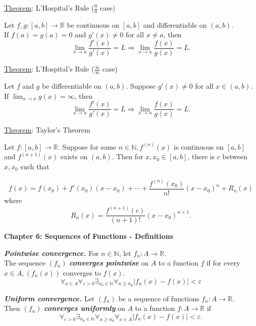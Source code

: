 \documentclass[12pt]{article}
\newcommand{\RR}{\mathbb{R}} %
\newcommand{\NN}{\mathbb{N}}
\newcommand\abs[1]{\left| #1 \right|} %
\newcommand{\eps}{\varepsilon}
\newcommand\defword[1]{\textit{\textbf{#1}}}
\begin{document}
\hrulefill

\underline{Theorem}: L'Hospital's Rule ($\frac{0}{0}$ case)

Let $f, g : [a, b] \rightarrow \RR$ be continuous on $[a, b]$ and differentiable on $(a, b)$.
\\
If $f(a) = g(a) = 0$ and $g'(x) \ne 0$ for all $x \ne a$, then
\[
\lim \limits_{x \rightarrow a} \frac{f'(x)}{g'(x)} = L \Rightarrow \lim \limits_{x \rightarrow a} \frac{f(x)}{g(x)} = L.
\]

\hrulefill

\underline{Theorem}: L'Hospital's Rule ($\frac{\infty}{\infty}$ case)

Let $f$ and $g$ be differentiable on $(a, b)$. Suppose $g'(x) \ne 0$ for all $x \in (a, b)$. If $\lim_{x \rightarrow a} g(x) = \infty$, then
\[
\lim \limits_{x \rightarrow a} \frac{f'(x)}{g'(x)} = L \Rightarrow \lim \limits_{x \rightarrow a} \frac{f(x)}{g(x)} = L.
\]

\pagebreak

\underline{Theorem}: Taylor's Theorem

Let $f : [a, b] \rightarrow \RR$. Suppose for some $n \in \NN, f^{(n)} (x)$ is continuous on $[a, b]$ and $f^{(n + 1)} (x)$ exists on $(a, b)$. Then for $x, x_0 \in [a, b]$, there is $c$ between $x, x_0$ such that

\[
f(x) = f(x_0) + f'(x_0)(x - x_0) + \cdots + \frac{f^{(n)} (x_0)}{n!} (x - x_0)^n + R_n (x)
\]
where
\[
R_n (x) = \frac{f^{(n + 1)} (c)}{(n + 1)!} (x - x_0)^{n + 1}.
\]

\pagebreak

\textbf{Chapter 6: Sequences of Functions - Definitions}

\hrulefill

\defword{Pointwise convergence.} For $n \in \NN$, let $f_n : A \rightarrow \RR$.
\\
The sequence $(f_n)$ \defword{converges pointwise} on $A$ to a function $f$ if for every
\\
$x \in A, (f_n (x))$ converges to $f(x)$.
\[
\forall_{x \in A} \forall_{\eps > 0} \exists_{n_0 \in \NN} \forall_{n \ge n_0} \abs{f_n (x) - f(x)} < \eps
\]

\hrulefill

\defword{Uniform convergence.} Let $(f_n)$ be a sequence of functions $f_n : A \rightarrow \RR$.
\\
Then $(f_n)$ \defword{converges uniformly} on $A$ to a function $f : A \rightarrow \RR$ if
\[
\forall_{\eps > 0} \exists_{n_0 \in \NN} \forall_{n \ge n_0} \forall_{x \in A} \abs{f_n (x) - f(x)} < \eps.
\]
\end{document}
